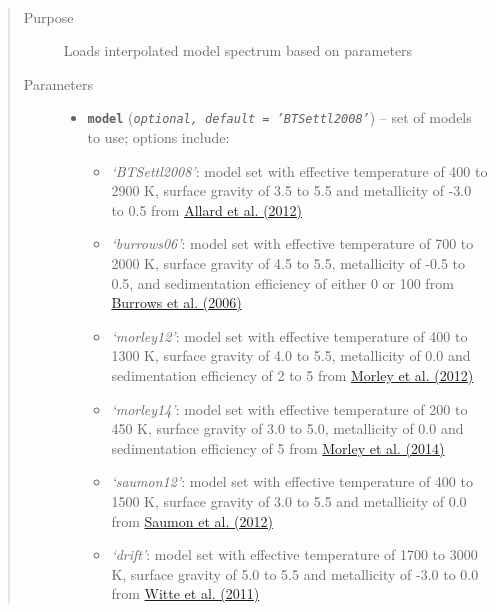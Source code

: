 \documentclass[letterpaper,10pt,english]{sphinxmanual}
\begin{document}
\begin{fulllineitems}
\label{splat_model:splat_model.loadInterpolatedModel}~\begin{quote}\begin{description}
\item[{Purpose}] \leavevmode
Loads interpolated model spectrum based on parameters

\item[{Parameters}] \leavevmode\begin{itemize}
\item {} 
\textbf{\texttt{model}} (\emph{\texttt{optional, default = 'BTSettl2008'}}) -- 
set of models to use; options include:
\begin{itemize}
\item {} 
\emph{`BTSettl2008'}: model set with effective temperature of 400 to 2900 K, surface gravity of 3.5 to 5.5 and metallicity of -3.0 to 0.5
from \href{http://adsabs.harvard.edu/abs/2012RSPTA.370.2765A}{Allard et al. (2012)}

\item {} 
\emph{`burrows06'}: model set with effective temperature of 700 to 2000 K, surface gravity of 4.5 to 5.5, metallicity of -0.5 to 0.5,
and sedimentation efficiency of either 0 or 100 from \href{http://adsabs.harvard.edu/abs/2006ApJ...640.1063B}{Burrows et al. (2006)}

\item {} 
\emph{`morley12'}: model set with effective temperature of 400 to 1300 K, surface gravity of 4.0 to 5.5, metallicity of 0.0
and sedimentation efficiency of 2 to 5 from \href{http://adsabs.harvard.edu/abs/2012ApJ...756..172M}{Morley et al. (2012)}

\item {} 
\emph{`morley14'}: model set with effective temperature of 200 to 450 K, surface gravity of 3.0 to 5.0, metallicity of 0.0
and sedimentation efficiency of 5 from \href{http://adsabs.harvard.edu/abs/2014ApJ...787...78M}{Morley et al. (2014)}

\item {} 
\emph{`saumon12'}: model set with effective temperature of 400 to 1500 K, surface gravity of 3.0 to 5.5 and metallicity of 0.0
from \href{http://adsabs.harvard.edu/abs/2012ApJ...750...74S}{Saumon et al. (2012)}

\item {} 
\emph{`drift'}: model set with effective temperature of 1700 to 3000 K, surface gravity of 5.0 to 5.5 and metallicity of -3.0 to 0.0
from \href{http://adsabs.harvard.edu/abs/2011A\%26A...529A..44W}{Witte et al. (2011)}


\end{itemize}
\end{itemize}
\end{description}
\end{quote}
\end{fulllineitems}
\end{document}
